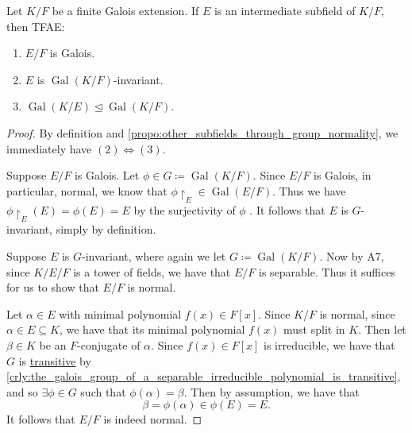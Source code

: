 \documentclass[notoc,notitlepage,nobib]{tufte-book}
\DeclareMathOperator{\Gal}{Gal}
\begin{document}
\begin{propo}\label{propo:intermediate_subfields_and_normal_subfields}
  Let $K / F$ be a finite Galois extension. If $E$ is an intermediate subfield
  of $K / F$, then TFAE:
  \begin{enumerate}
    \item $E / F$ is Galois.
    \item $E$ is $\Gal(K / F)$-invariant.
    \item $\Gal(K / E) \trianglelefteq \Gal(K / F)$.
  \end{enumerate}
\end{propo}

\begin{proof}
  By definition and \cref{propo:other_subfields_through_group_normality}, we
  immediately have $(2) \iff (3)$.

  \noindent
   Suppose $E / F$ is Galois. Let $\phi \in G
  \coloneqq \Gal(K / F)$. Since $E / F$ is Galois, in particular, normal, we
  know that $\phi \restriction_{E} \in \Gal(E / F)$. Thus we have $\phi
  \restriction_E (E) = \phi(E) = E$ by the surjectivity of $\phi$ . It follows that $E$ 
  is $G$-invariant, simply by definition.

  \noindent
   Suppose $E$ is $G$-invariant, where again we let
  $G \coloneqq \Gal(K / F)$. Now by A7, since $K / E / F$ is a tower of fields,
  we have that $E / F$ is separable. Thus it suffices for us to show that $E /
  F$ is normal.

  Let $\alpha \in E$ with minimal polynomial $f(x) \in F[x]$. 
  Since $K / F$ is normal, since $\alpha \in E \subseteq K$, we have that its
  minimal polynomial $f(x)$ must split in $K$. Then let $\beta \in K$ be an
  $F$-conjugate of $\alpha$. Since $f(x) \in F[x]$ is irreducible, we have that
  $G$ is \hyperref[defn:transitive_subgroup]{transitive} by
  \cref{crly:the_galois_group_of_a_separable_irreducible_polynomial_is_transitive},
  and so $\exists \phi \in G$ such that $\phi(\alpha) = \beta$. Then by
  assumption, we have that
  \begin{equation*}
    \beta = \phi(\alpha) \in \phi(E) = E.
  \end{equation*}
  It follows that $E / F$ is indeed normal.
\end{proof}
\end{document}
